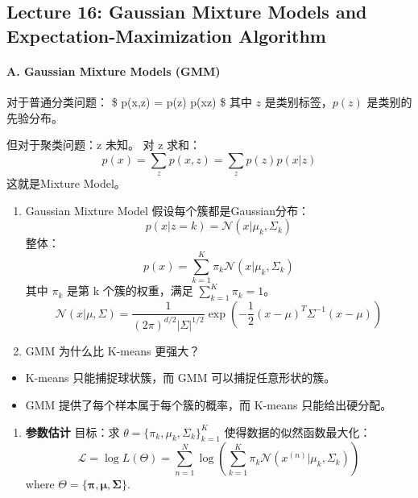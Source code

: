 \documentclass[
]{ctexart}
\providecommand{\tightlist}{%
  \setlength{\itemsep}{0pt}\setlength{\parskip}{0pt}}
\begin{document}
\clearpage

\subsection{Lecture 16: Gaussian Mixture Models and
Expectation-Maximization
Algorithm}\label{lecture-16-gaussian-mixture-models-and-expectation-maximization-algorithm}

\paragraph{A. Gaussian Mixture Models
(GMM)}\label{a.-gaussian-mixture-models-gmm}

对于普通分类问题： \$ p(x,z) = p(z) p(x\textbar z) \$ 其中 \(z\)
是类别标签，\(p(z)\) 是类别的先验分布。

但对于聚类问题：z 未知。 对 z 求和：
\[p(x) = \sum_{z} p(x,z) = \sum_{z} p(z) p(x|z)\] 这就是Mixture Model。

\begin{enumerate}
\def\labelenumi{\arabic{enumi}.}
\item
  Gaussian Mixture Model 假设每个簇都是Gaussian分布：
  \[p(x|z=k) = \mathcal{N}(x|\mu_k, \Sigma_k)\] 整体：
  \[p(x) = \sum_{k=1}^K \pi_k \mathcal{N}(x|\mu_k, \Sigma_k)\] 其中
  \(\pi_k\) 是第 k 个簇的权重，满足 \(\sum_{k=1}^K \pi_k = 1\)。
  \[\mathcal{N}(x|\mu, \Sigma) = \frac{1}{(2\pi)^{d/2} |\Sigma|^{1/2}} \exp\left(-\frac{1}{2}(x-\mu)^T \Sigma^{-1} (x-\mu)\right)\]
\item
  GMM 为什么比 K-means 更强大？
\end{enumerate}

\begin{itemize}
\tightlist
\item
  K-means 只能捕捉球状簇，而 GMM 可以捕捉任意形状的簇。
\item
  GMM 提供了每个样本属于每个簇的概率，而 K-means 只能给出硬分配。
\end{itemize}

\begin{enumerate}
\def\labelenumi{\arabic{enumi}.}
\setcounter{enumi}{2}
\tightlist
\item
  \textbf{参数估计} 目标：求
  \(\theta = \{\pi_k, \mu_k, \Sigma_k\}_{k=1}^K\)
  使得数据的似然函数最大化：
  \[\mathcal{L} = \log L(\Theta)=\sum_{n=1}^{N}\log \left(\sum_{k=1}^{K}\pi_k \mathcal{N}(x^{(n)}|\mu_k,\Sigma_k)\right)\]
  where \(\Theta = \{\boldsymbol{\pi}, \boldsymbol{\mu}, \boldsymbol{\Sigma}\}\).
\end{enumerate}
\end{document}

